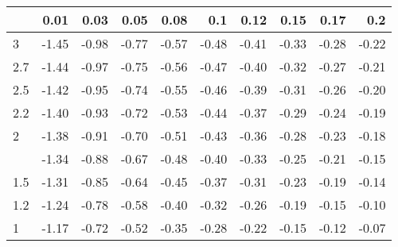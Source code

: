 
\begin{tabular}{lrrrrrrrrr}
\toprule
  & 0.01 & 0.03 & 0.05 & 0.08 & 0.1 & 0.12 & 0.15 & 0.17 & 0.2\\
\midrule
3 & -1.45 & -0.98 & -0.77 & -0.57 & -0.48 & -0.41 & -0.33 & -0.28 & -0.22\\
2.7 & -1.44 & -0.97 & -0.75 & -0.56 & -0.47 & -0.40 & -0.32 & -0.27 & -0.21\\
2.5 & -1.42 & -0.95 & -0.74 & -0.55 & -0.46 & -0.39 & -0.31 & -0.26 & -0.20\\
2.2 & -1.40 & -0.93 & -0.72 & -0.53 & -0.44 & -0.37 & -0.29 & -0.24 & -0.19\\
2 & -1.38 & -0.91 & -0.70 & -0.51 & -0.43 & -0.36 & -0.28 & -0.23 & -0.18\\
\addlinespace
1.7 & -1.34 & -0.88 & -0.67 & -0.48 & -0.40 & -0.33 & -0.25 & -0.21 & -0.15\\
1.5 & -1.31 & -0.85 & -0.64 & -0.45 & -0.37 & -0.31 & -0.23 & -0.19 & -0.14\\
1.2 & -1.24 & -0.78 & -0.58 & -0.40 & -0.32 & -0.26 & -0.19 & -0.15 & -0.10\\
1 & -1.17 & -0.72 & -0.52 & -0.35 & -0.28 & -0.22 & -0.15 & -0.12 & -0.07\\
\bottomrule
\end{tabular}
